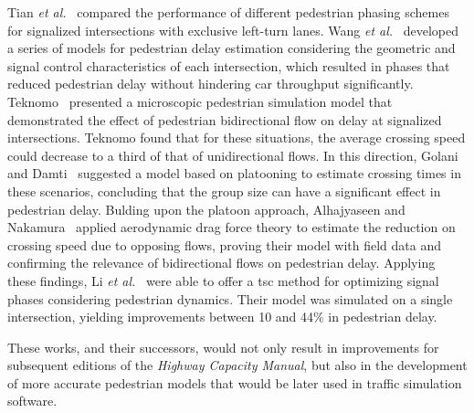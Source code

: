 Tian \textit{et al.}~\cite{Tian2001} compared the performance of different pedestrian phasing schemes for signalized intersections with exclusive left-turn lanes. Wang \textit{et al.}~\cite{Wang2009} developed a series of models for pedestrian delay estimation considering the geometric and signal control characteristics of each intersection, which resulted in phases that reduced pedestrian delay without hindering car throughput significantly. Teknomo~\cite{Teknomo2006} presented a microscopic pedestrian simulation model that demonstrated the effect of pedestrian bidirectional flow on delay at signalized intersections. Teknomo found that for these situations, the average crossing speed could decrease to a third of that of unidirectional flows. In this direction, Golani and Damti~\cite{Golani2007} suggested a model based on platooning to estimate crossing times in these scenarios, concluding that the group size can have a significant effect in pedestrian delay. Bulding upon the platoon approach, Alhajyaseen and Nakamura~\cite{Alhajyaseen2009} applied aerodynamic drag force theory to estimate the reduction on crossing speed due to opposing flows, proving their model with field data and confirming the relevance of bidirectional flows on pedestrian delay. Applying these findings, Li \textit{et al.}~\cite{Li2010} were able to offer a \gls{tsc} method for optimizing signal phases considering pedestrian dynamics. Their model was simulated on a single intersection, yielding improvements between 10 and 44\% in pedestrian delay.

These works, and their successors, would not only result in improvements for subsequent editions of the \textit{Highway Capacity Manual}, but also in the development of more accurate pedestrian models that would be later used in traffic simulation software.

\medskip

